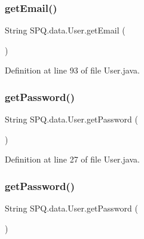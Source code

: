 \subsubsection{\texorpdfstring{get\+Email()}{getEmail()}\hspace{0.1cm}{\footnotesize\ttfamily [4/4]}}
{\footnotesize\ttfamily String S\+P\+Q.\+data.\+User.\+get\+Email (\begin{DoxyParamCaption}{ }\end{DoxyParamCaption})}



Definition at line 93 of file User.\+java.

\mbox{\label{class_s_p_q_1_1data_1_1_user_a688c1eadd21594d52967d87289e23ce2}} 
\subsubsection{\texorpdfstring{get\+Password()}{getPassword()}\hspace{0.1cm}{\footnotesize\ttfamily [1/4]}}
{\footnotesize\ttfamily String S\+P\+Q.\+data.\+User.\+get\+Password (\begin{DoxyParamCaption}{ }\end{DoxyParamCaption})}



Definition at line 27 of file User.\+java.

\mbox{\label{class_s_p_q_1_1data_1_1_user_a688c1eadd21594d52967d87289e23ce2}} 
\subsubsection{\texorpdfstring{get\+Password()}{getPassword()}\hspace{0.1cm}{\footnotesize\ttfamily [2/4]}}
{\footnotesize\ttfamily String S\+P\+Q.\+data.\+User.\+get\+Password (\begin{DoxyParamCaption}{ }\end{DoxyParamCaption})}



